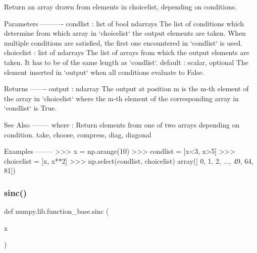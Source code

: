\begin{DoxyVerb}Return an array drawn from elements in choicelist, depending on conditions.

Parameters
----------
condlist : list of bool ndarrays
    The list of conditions which determine from which array in `choicelist`
    the output elements are taken. When multiple conditions are satisfied,
    the first one encountered in `condlist` is used.
choicelist : list of ndarrays
    The list of arrays from which the output elements are taken. It has
    to be of the same length as `condlist`.
default : scalar, optional
    The element inserted in `output` when all conditions evaluate to False.

Returns
-------
output : ndarray
    The output at position m is the m-th element of the array in
    `choicelist` where the m-th element of the corresponding array in
    `condlist` is True.

See Also
--------
where : Return elements from one of two arrays depending on condition.
take, choose, compress, diag, diagonal

Examples
--------
>>> x = np.arange(10)
>>> condlist = [x<3, x>5]
>>> choicelist = [x, x**2]
>>> np.select(condlist, choicelist)
array([ 0,  1,  2, ..., 49, 64, 81])\end{DoxyVerb}
 \mbox{\label{namespacenumpy_1_1lib_1_1function__base_a83338bd07f78cb8166c23d97fffbf33e}} 
\subsubsection{\texorpdfstring{sinc()}{sinc()}}
{\footnotesize\ttfamily def numpy.\+lib.\+function\+\_\+base.\+sinc (\begin{DoxyParamCaption}\item[{}]{x }\end{DoxyParamCaption})}

